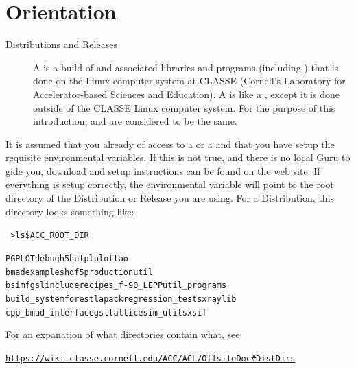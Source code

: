 \documentclass{hitec}
\begin{document}
\section{Orientation}

  \begin{description}
  \item[Distributions and Releases] \Newline
A  is a build of \bmad and associated libraries and programs (including \tao)
that is done on the Linux computer system at CLASSE (Cornell's Laboratory for
Accelerator-based Sciences and Education). A  is like a ,
except it is done outside of the CLASSE Linux computer system.  For the purpose
of this introduction,  and  are considered to be the same.
  \end{description}

It is assumed that you already of access to a  or a  and that
you have setup the requisite environmental variables. If this is not true, and there is no
local Guru to gide you, download and setup instructions can be found on the \bmad web
site. If everything is setup correctly, the environmental variable  will
point to the root directory of the Distribution or Release you are using. For a
Distribution, this directory looks something like:
\begin{alltt}
  ~> ls \$ACC_ROOT_DIR

  PGPLOT                debug       h5hut        plplot                tao
  bmad                  examples    hdf5         production            util
  bsim                  fgsl        include      recipes_f-90_LEPP     util_programs
  build_system          forest      lapack       regression_tests      xraylib
  cpp_bmad_interface    gsl         lattice      sim_utils             xsif
\end{alltt}

For an expanation of what directories contain what, see:
\begin{alltt}
  \url{https://wiki.classe.cornell.edu/ACC/ACL/OffsiteDoc#DistDirs}
\end{alltt}
\end{document}
